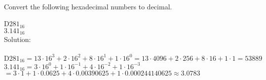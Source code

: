 Convert the following hexadecimal numbers to decimal. \\
\\
$\textrm{D}281_{16}$ \\
$3.141_{16}$ \\

Solution: \\
\\
$\textrm{D}281_{16} = 13 \cdot 16^3 + 2 \cdot 16^2 + 8 \cdot 16^1 + 1 \cdot 16^0 = 13 \cdot 4096 + 2 \cdot 256 + 8 \cdot 16 + 1 \cdot 1 = 53889$ \\
$3.141_{16} = 3 \cdot 16^0 + 1 \cdot 16^{-1} + 4 \cdot 16^{-2} + 1 \cdot 16^{-3}$\\
$= 3 \cdot 1 + 1 \cdot 0.0625 + 4 \cdot 0.00390625 + 1 \cdot 0.000244140625 \approx 3.0783$ \\
\\
